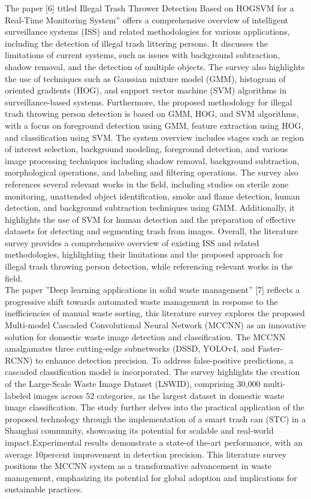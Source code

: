\documentclass[12pt, English]{article}
\begin{document}
The paper [6] titled Illegal Trash Thrower Detection Based on HOGSVM for a Real-Time Monitoring System” offers a comprehensive overview of intelligent surveillance systems (ISS) and related methodologies for various applications, including the detection of illegal trash littering persons. It discusses the limitations of current systems, such as issues with background subtraction, shadow removal, and the detection of multiple objects. The survey also highlights the use of techniques such as Gaussian mixture model (GMM), histogram of oriented gradients (HOG), and support vector machine (SVM) algorithms in surveillance-based systems. Furthermore, the proposed methodology for illegal trash throwing person detection is based on GMM, HOG, and SVM algorithms, with a focus on foreground detection using GMM, feature extraction using HOG, and classification using SVM. The system overview includes stages such as region of interest selection, background modeling, foreground detection, and various image processing techniques including shadow removal, background subtraction, morphological operations, and labeling and filtering operations. The survey also references several relevant works in the field, including studies on sterile zone monitoring,
unattended object identification, smoke and flame detection, human detection, and background subtraction techniques using GMM. Additionally, it highlights the use of SVM for human detection and the preparation of effective datasets for detecting and segmenting trash from images. Overall, the literature survey provides a comprehensive overview of existing ISS and related methodologies, highlighting their limitations and the proposed approach for illegal trash throwing person detection, while referencing relevant works in the field.\\

The paper ”Deep learning applications in solid waste management” [7] reflects a progressive shift towards automated waste management in response to the inefficiencies of manual waste sorting, this literature survey explores the proposed Multi-model Cascaded Convolutional Neural Network (MCCNN) as an innovative solution for domestic waste image detection and classification. The MCCNN amalgamates three cutting-edge subnetworks (DSSD, YOLOv4, and
Faster-RCNN) to enhance detection precision. To address false-positive predictions, a cascaded classification model is incorporated. The survey highlights the creation of the Large-Scale Waste Image Dataset (LSWID), comprising 30,000 multi-labeled images across 52 categories, as the largest dataset in domestic waste
image classification. The study further delves into the practical application of the proposed technology through the implementation of a smart trash can (STC) in a Shanghai community, showcasing its potential for scalable and real-world impact.Experimental results demonstrate a state-of the-art performance, with an average
10percent improvement in detection precision. This literature survey positions the MCCNN system as a transformative advancement in waste management, emphasizing its potential for global adoption and implications for sustainable practices.\\
\end{document}
